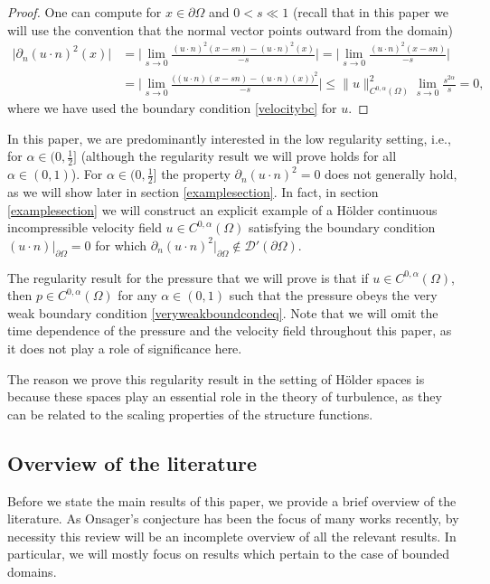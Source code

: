 \documentclass[12pt,a4paper]{article}
\theoremstyle{definition}
\theoremstyle{remark}
\numberwithin{equation}{section}
\begin{document}
\begin{proof}
One can compute for $x \in \partial \Omega$ and $0 < s \ll 1$ (recall that in this paper we will use the convention that the normal vector points outward from the domain)
\begin{align*}
\lvert \partial_n (u \cdot n)^2 (x) \rvert &= \bigg\lvert \lim_{s \rightarrow 0} \frac{(u \cdot n)^2 (x - s n) - (u \cdot n)^2 (x)}{-s} \bigg\rvert = \bigg\lvert \lim_{s \rightarrow 0} \frac{(u \cdot n)^2 (x - s n) }{-s} \bigg\rvert \\
&= \bigg\lvert \lim_{s \rightarrow 0} \frac{\big( (u \cdot n) (x - s n) - (u \cdot n) (x) \big)^2}{-s} \bigg\rvert \leq \lVert u \rVert_{C^{0,\alpha} (\Omega)}^2 \lim_{s \rightarrow 0} \frac{s^{2 \alpha}}{s} = 0,
\end{align*}
where we have used the boundary condition \eqref{velocitybc} for $u$.
\end{proof}

In this paper, we are predominantly interested in the low regularity setting, i.e., for $\alpha \in (0, \frac{1}{2}]$ (although the regularity result we will prove holds for all $\alpha \in (0,1)$). For $\alpha \in (0, \frac{1}{2}]$ the property $\partial_n (u \cdot n)^2 = 0$ does not generally hold, as we will show later in section \ref{examplesection}. In fact, in section \ref{examplesection} we will construct an explicit example of a Hölder continuous incompressible velocity field $u \in C^{0,\alpha} (\Omega)$ satisfying the boundary condition $(u \cdot n) \lvert_{\partial \Omega} = 0$ for which $\partial_n (u \cdot n)^2 \lvert_{\partial \Omega} \notin \mathcal{D}' (\partial \Omega)$. 

The regularity result for the pressure that we will prove is that if $u \in C^{0,\alpha} (\Omega)$, then $p \in C^{0,\alpha} (\Omega)$ for any $\alpha \in (0,1)$ such that the pressure obeys the very weak boundary condition \eqref{veryweakboundcondeq}. Note that we will omit the time dependence of the pressure and the velocity field throughout this paper, as it does not play a role of significance here.

The reason we prove this regularity result in the setting of H\"older spaces is because these spaces play an essential role in the theory of turbulence, as they can be related to the scaling properties of the structure functions. 
\subsection{Overview of the literature}
Before we state the main results of this paper, we provide a brief overview of the literature. As Onsager's conjecture has been the focus of many works recently, by necessity this review will be an incomplete overview of all the relevant results. In particular, we will mostly focus on results which pertain to the case of bounded domains.
\end{document}
